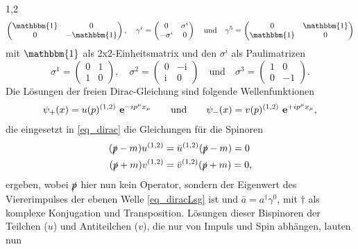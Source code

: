 \documentclass[11pt,a4paper,twoside]{report}
\begin{document}
\begin{spacing}{1,2}
\begin{equation*}
\begin{pmatrix}
              \mathbbm{1} & 0 \\
              0 & -\mathbbm{1}
             \end{pmatrix},\quad \gamma^i = \begin{pmatrix}
					0 & \sigma^i\\
					-\sigma^i & 0
				      \end{pmatrix} \quad \text{und}\quad \gamma^5 = \begin{pmatrix}
									  0 & \mathbbm{1}\\
									  \mathbbm{1} & 0
									   \end{pmatrix}
\end{equation*}
mit $\mathbbm{1}$ als 2x2-Einheitsmatrix und den $\sigma^i$ als Paulimatrizen
\begin{equation*}
 \sigma^1 = \begin{pmatrix}
             0 & 1\\
             1 & 0
            \end{pmatrix},\quad \sigma^2 = \begin{pmatrix}
					    0 & -\text{i}\\
					    \text{i} & 0
					    \end{pmatrix}\quad \text{und} \quad\sigma^3 = \begin{pmatrix}
									    1 & 0\\
									    0 & -1
									    \end{pmatrix}.									    
\end{equation*}
Die Lösungen der freien Dirac-Gleichung sind folgende Wellenfunktionen
\begin{align}
 \psi_+(x) = u(p)^{(1,2)} \ \mathbf{e}^{-ip^\mu x_\mu}\qquad\text{und}\qquad \psi_-(x) = v(p)^{(1,2)} \ \mathbf{e}^{+ip^\mu x_\mu},
 \label{eq_diracLsg}
\end{align}
die eingesetzt in \eqref{eq_dirac} die Gleichungen für die Spinoren
\begin{align}
 (\slashed{p} - m )u^{(1,2)} &= \bar u^{(1,2)}(\slashed{p}-m) = 0 \\
 (\slashed{p} + m )v^{(1,2)} &= \bar v^{(1,2)}(\slashed{p}+m) = 0,
\end{align}
ergeben, wobei $\slashed{p}$ hier nun kein Operator, sondern der Eigenwert des Viererimpulses der ebenen Welle \eqref{eq_diracLsg} ist und $\bar a = a^\dagger \gamma^0$,
mit $\dagger$ als komplexe Konjugation und Transposition. Lösungen dieser Bispinoren der Teilchen ($u$) und Antiteilchen ($v$), die nur von Impuls und Spin abhängen,
lauten nun
\begin{equation}

\end{equation}
\end{spacing}
\end{document}
